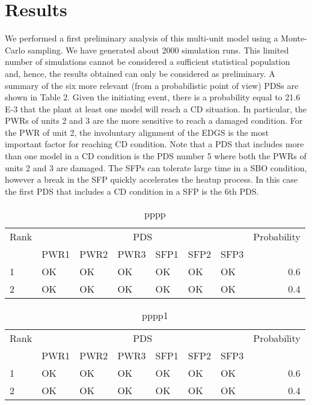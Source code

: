 \section{Results}
\label{sec:results}

We performed a first preliminary analysis of this multi-unit model using a Monte-Carlo sampling. 
We have generated about 2000 simulation runs.  This limited number of simulations cannot be considered 
a sufficient statistical population and, hence, the results obtained can only be considered as preliminary.
A summary of the six more relevant (from a probabilistic point of view) PDSs are shown in Table 2. 
Given the initiating event, there is a probability equal to 21.6 E-3 that the plant at least one model 
will reach a CD situation. In particular, the PWRs of units 2 and 3 are the more sensitive to reach a 
damaged condition. For the PWR of unit 2, the involuntary alignment of the EDGS is the most important 
factor for reaching CD condition.
Note that a PDS that includes more than one model in a CD condition is the PDS number 5 where both the 
PWRs of units 2 and 3 are damaged.
The SFPs can tolerate large time in a SBO condition, however a break in the SFP quickly accelerates 
the heatup process. In this case the first PDS that includes a CD condition in a SFP is the 6th PDS.

\begin{table}
  \centering
  \begin{tabular}{lllllllr}
    \hline
    Rank & \multicolumn{6}{c}{PDS} & Probability           \\
    \cline{2-7}
         & PWR1 & PWR2 & PWR3 & SFP1 & SFP2 & SFP3 &       \\
    \hline
     1   & OK   & OK   & OK   & OK   & OK   & OK   & 0.6   \\
     2   & OK   & OK   & OK   & OK   & OK   & OK   & 0.4   \\
    \hline
  \end{tabular}
  \caption{pppp}
  \label{tab:resultsMain}
\end{table}

\begin{table}
  \centering
  \begin{tabular}{lllllllr}
    \hline
    Rank & \multicolumn{6}{c}{PDS} & Probability           \\
    \cline{2-7}
         & PWR1 & PWR2 & PWR3 & SFP1 & SFP2 & SFP3 &       \\
    \hline
     1   & OK   & OK   & OK   & OK   & OK   & OK   & 0.6   \\
     2   & OK   & OK   & OK   & OK   & OK   & OK   & 0.4   \\
    \hline
  \end{tabular}
  \caption{pppp1}
  \label{tab:results1}
\end{table}

